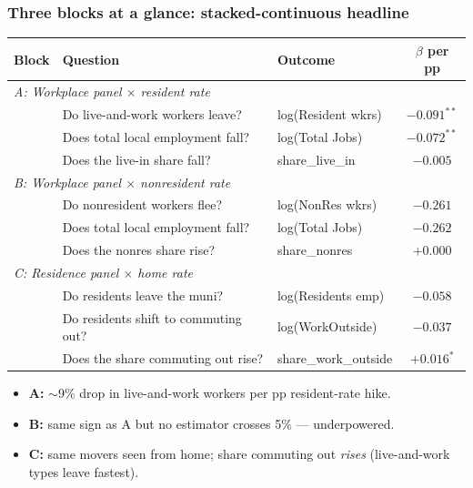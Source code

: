 \documentclass[xcolor = x11names, compress, aspectratio = 169]{beamer}
\renewcommand{\(}{\begin{columns}}
\renewcommand{\)}{\end{columns}}
\newcommand{\<}[1]{\begin{column}{#1}}
\renewcommand{\>}{\end{column}}
\begin{document}
\begin{frame}
\frametitle{Three blocks at a glance: stacked-continuous headline}
    \centering
    \scriptsize
    \renewcommand{\arraystretch}{1.20}
    \setlength{\tabcolsep}{6pt}
    \begin{tabular}{lllc}
        \toprule
        Block & Question & Outcome & $\beta$ per pp \\
        \midrule
        \multicolumn{4}{l}{\textit{A: Workplace panel $\times$ resident rate}} \\
        & Do live-and-work workers leave?    & log(Resident wkrs) & $\mathbf{-0.091^{**}}$ \\
        & Does total local employment fall?  & log(Total Jobs)    & $\mathbf{-0.072^{**}}$ \\
        & Does the live-in share fall?       & share\_live\_in    & $-0.005$ \\
        \midrule
        \multicolumn{4}{l}{\textit{B: Workplace panel $\times$ nonresident rate}} \\
        & Do nonresident workers flee?       & log(NonRes wkrs)   & $-0.261$ \\
        & Does total local employment fall?  & log(Total Jobs)    & $-0.262$ \\
        & Does the nonres share rise?        & share\_nonres      & $+0.000$ \\
        \midrule
        \multicolumn{4}{l}{\textit{C: Residence panel $\times$ home rate}} \\
        & Do residents leave the muni?       & log(Residents emp) & $-0.058$ \\
        & Do residents shift to commuting out? & log(WorkOutside) & $-0.037$ \\
        & Does the share commuting out rise? & share\_work\_outside & $\mathbf{+0.016^{*}}$ \\
        \bottomrule
    \end{tabular}
    \vspace{0.04cm}
    \begin{itemize}\setlength{\itemsep}{0.02cm}\scriptsize
        \item \textbf{A:} $\sim$9\% drop in live-and-work workers per pp resident-rate hike.
        \item \textbf{B:} same sign as A but no estimator crosses 5\% --- underpowered.
        \item \textbf{C:} same movers seen from home; share commuting out \emph{rises} (live-and-work types leave fastest).
    \end{itemize}
\end{frame}
\end{document}
